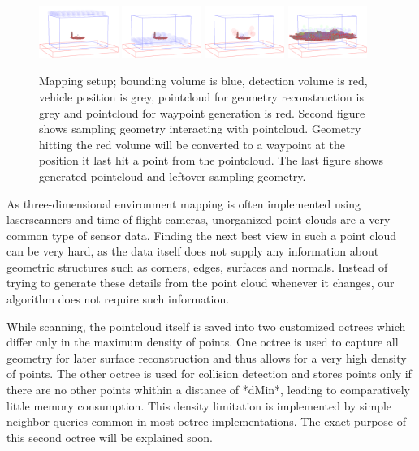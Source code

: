 \documentclass[a4paper, 10pt, conference]{ieeeconf}      %
\begin{document}
\begin{figure}[ht]
  \centering
    \includegraphics[width=0.23\textwidth]{images/expl1}
    \includegraphics[width=0.23\textwidth]{images/expl2}
    \includegraphics[width=0.23\textwidth]{images/expl3}
    \includegraphics[width=0.23\textwidth]{images/process5}
    \caption{Mapping setup; bounding volume is blue, detection volume is red, vehicle position is grey, pointcloud for geometry reconstruction is grey and pointcloud for waypoint generation is red. Second figure shows sampling geometry interacting with pointcloud. Geometry hitting the red volume will be converted to a waypoint at the position it last hit a point from the pointcloud. The last figure shows generated pointcloud and leftover sampling geometry.}
\end{figure}

As three-dimensional environment mapping is often implemented using laserscanners and time-of-flight cameras, unorganized point clouds are a very common type of sensor data. Finding the next best view in such a point cloud can be very hard, as the data itself does not supply any information about geometric structures such as corners, edges, surfaces and normals. Instead of trying to generate these details from the point cloud whenever it changes, our algorithm does not require such information.

While scanning, the pointcloud itself is saved into two customized octrees which differ only in the maximum density of points. One octree is used to capture all geometry for later surface reconstruction and thus allows for a very high density of points. The other octree is used for collision detection and stores points only if there are no other points whithin a distance of *dMin*, leading to comparatively little memory consumption. This density limitation is implemented by simple neighbor-queries common in most octree implementations. The exact purpose of this second octree will be explained soon.
\end{document}
